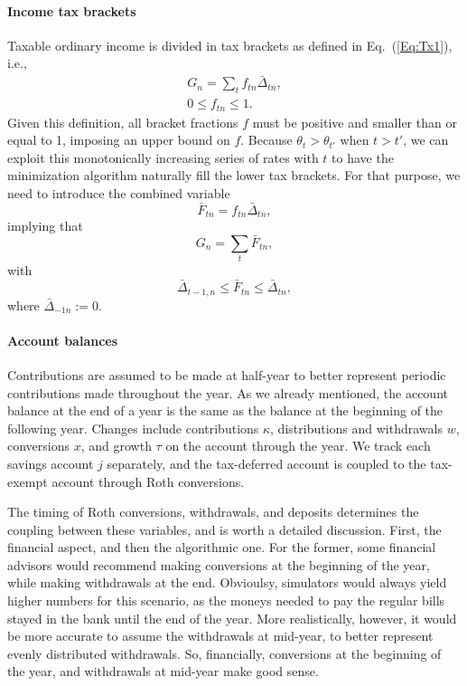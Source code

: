 \documentclass{report}[fleqn,12pt]
\begin{document}
\paragraph*{Income tax brackets}
	Taxable ordinary income is divided in tax brackets as defined in Eq.~(\ref{Eq:Tx1}), i.e.,
	\begin{eqnarray}
		\label{Eq:C2}
		G_n = \sum_t f_{tn}\bar{\Delta}_{tn} ,\nonumber\\
		0 \leq f_{tn} \leq 1.
	\end{eqnarray}
	Given this definition, all bracket fractions $f$ must be positive and smaller than or equal to 1,
	imposing an upper bound on $f$.
	Because $\theta_{t} > \theta_{t'}$ when $t > t'$, we can exploit
	this monotonically increasing series of rates with $t$ to have the minimization
	algorithm naturally fill the lower tax brackets.
	For that purpose, we need to introduce the combined variable
	\begin{equation}
		\bar{F}_{tn} = f_{tn}\bar{\Delta}_{tn},
	\end{equation}
	implying that
	\begin{equation}
		G_n = \sum_t \bar{F}_{tn},
	\end{equation}
	with
	\begin{equation}
		\bar{\Delta}_{t-1,n} \le \bar{F}_{tn} \le \bar{\Delta}_{tn},
	\end{equation}
	where $\bar{\Delta}_{-1n} := 0$.

\paragraph*{Account balances}
	Contributions are assumed to be made at half-year to better represent periodic contributions
	made throughout the year. As we already mentioned,
	the account balance at the end of a year is the same as the balance
	at the beginning of the following year.
	Changes include contributions $\kappa$, distributions and withdrawals $w$,
	conversions $x$, and growth $\tau$ on the account through the year.
	We track each savings account $j$ separately, and the tax-deferred account
	is coupled to the tax-exempt account through Roth conversions.

	The timing of Roth conversions, withdrawals, and deposits determines
	the coupling between these variables, and is worth a detailed discussion.
	First, the financial aspect, and then the algorithmic one.
	For the former, some financial advisors would recommend making
	conversions at the beginning of the year, while making withdrawals
	at the end. Obvioulsy, simulators would always yield higher numbers
	for this scenario, as the moneys needed to pay the regular bills 
	stayed in the bank until the end of the year. More realistically,
	however,
	it would be more accurate to assume the withdrawals at mid-year,
	to better represent evenly distributed withdrawals. So, financially,
	conversions at the beginning of the year, and withdrawals at mid-year
	make good sense.
\end{document}
